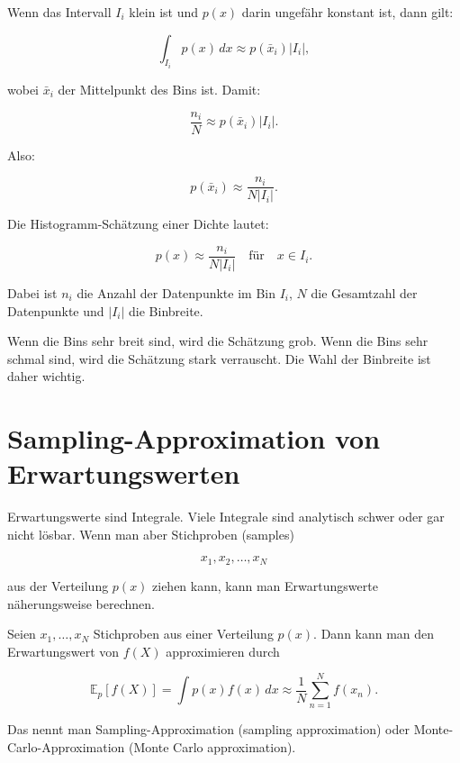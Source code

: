 Wenn das Intervall \(I_i\) klein ist und \(p(x)\) darin ungefähr konstant ist, dann gilt:

\[
    \int_{I_i} p(x)\,dx
    \approx
    p(\bar{x}_i)|I_i|,
\]

wobei \(\bar{x}_i\) der Mittelpunkt des Bins ist.
Damit:

\[
    \frac{n_i}{N}
    \approx
    p(\bar{x}_i)|I_i|.
\]

Also:

\[
    p(\bar{x}_i)
    \approx
    \frac{n_i}{N|I_i|}.
\]

\begin{conceptbox}
Die Histogramm-Schätzung einer Dichte lautet:

\[
    p(x)
    \approx
    \frac{n_i}{N|I_i|}
    \quad
    \text{für}
    \quad
    x \in I_i.
\]

Dabei ist \(n_i\) die Anzahl der Datenpunkte im Bin \(I_i\), \(N\) die Gesamtzahl der Datenpunkte und \(|I_i|\) die Binbreite.
\end{conceptbox}

\begin{notebox}
Wenn die Bins sehr breit sind, wird die Schätzung grob.
Wenn die Bins sehr schmal sind, wird die Schätzung stark verrauscht.
Die Wahl der Binbreite ist daher wichtig.
\end{notebox}

\section{Sampling-Approximation von Erwartungswerten}

Erwartungswerte sind Integrale.
Viele Integrale sind analytisch schwer oder gar nicht lösbar.
Wenn man aber Stichproben (samples)

\[
    x_1,x_2,\dots,x_N
\]

aus der Verteilung \(p(x)\) ziehen kann, kann man Erwartungswerte näherungsweise berechnen.

\begin{definitionbox}
Seien \(x_1,\dots,x_N\) Stichproben aus einer Verteilung \(p(x)\).
Dann kann man den Erwartungswert von \(f(X)\) approximieren durch

\[
    \mathbb{E}_p[f(X)]
    =
    \int p(x)f(x)\,dx
    \approx
    \frac{1}{N}
    \sum_{n=1}^{N} f(x_n).
\]

Das nennt man Sampling-Approximation (sampling approximation) oder Monte-Carlo-Approximation (Monte Carlo approximation).
\end{definitionbox}

